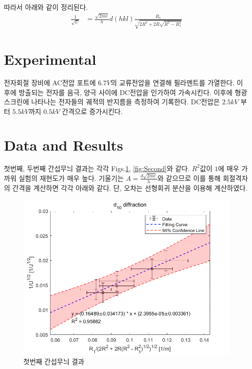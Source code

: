 \documentclass[%
 reprint,
 amsmath,amssymb,
 aps,
]{revtex4-2}
\begin{document}
따라서 아래와 같이 정리된다.
\begin{align}
	\frac{1}{\sqrt{U}} &=\frac{\sqrt{2me}}{h} d(hkl)\frac{R_{1}}{\sqrt{2R^{2} + 2R\sqrt{R^{2} - R_{1}^{2}}}}
\end{align}

\section{\label{sec:level1}Experimental}
전자회절 장비에 AC전압 포트에 $6.7V$의 교류전압을 연결해 필라멘트를 가열한다. 이후에 방출되는 전자를 음극, 양극 사이에 DC전압을 인가하여 가속시킨다. 이후에 형광스크린에 나타나는 전자들의 궤적의 반지름을 측정하여 기록한다. DC전압은 $2.5kV$ 부터 $5.5kV$까지 $0.5kV$ 간격으로 증가시킨다. 

\section{\label{sec:level1}Data and Results}
첫번째, 두번째 간섭무늬 결과는 각각 Figs.\ref{fig:First}, \ref{fig:Second}와 같다. $R^{2}$값이 $1$에 매우 가까워 실험의 재현도가 매우 높다. 기울기는 $A =\frac{d\sqrt{2me}}{h} $와 같으므로 이를 통해 회절격자의 간격을 계산하면 각각 아래와 같다. 단, 오차는 선형회귀 분산을 이용해 계산하였다.

\begin{figure}[htbp]
	\includegraphics[width = 0.95\linewidth]{First.png}%
	\caption{\label{fig:First}첫번째 간섭무늬 결과}
\end{figure}
\end{document}
